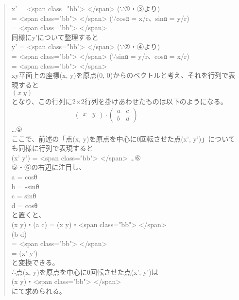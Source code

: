 \documentclass[11pt]{article}
\begin{document}
\begin{quote}
x' = <span class="bb"> </span>  (∵①・③より)\\
   = <span class="bb"> </span>  (∵cosα = x/r、sinα = y/r)\\
   = <span class="bb"> </span>\\

同様にy'について整理すると\\

y' = <span class="bb"> </span>  (∵②・④より)\\
   = <span class="bb"> </span>  (∵sinα = y/r、cosα = x/r)\\
   = <span class="bb"> </span>\\

xy平面上の座標(x, y)を原点(0, 0)からのベクトルと考え、それを行列で表現すると\\
\(\left(x\;y\right)\)\\
となり、この行列に2×2行列を掛けあわせたものは以下のようになる。\\
\begin{eqnarray*}
\begin{pmatrix}
x & y
\end{pmatrix}
\cdot
\begin{pmatrix}
a & c\\
b & d
\end{pmatrix}
 = 
\boxed{\phantom{hogehoge}}
\end{eqnarray*}
…⑤\\

ここで、前述の「点(x, y)を原点を中心にθ回転させた点(x', y')」についても同様に行列で表現すると\\

(x'  y') = <span class="bb"> </span>   …⑥\\

⑤・⑥の右辺に注目し、\\
a = cosθ\\
b = -sinθ\\
c = sinθ\\
d = cosθ\\
と置くと、\\

(x  y)・(a  c) = (x  y)・<span class="bb"> </span>\\
        (b  d)\\

= <span class="bb"> </span>\\
= (x'  y')\\

と変換できる。\\

∴点(x, y)を原点を中心にθ回転させた点(x', y')は\\

(x  y)・<span class="bb"> </span>\\

にて求められる。\\
\end{quote}
\end{document}
